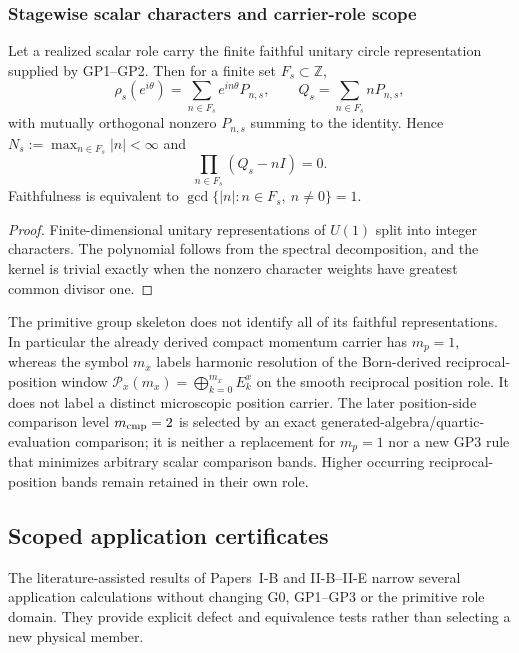 \documentclass[12pt,a4paper]{article}
\begin{document}
\subsubsection{Stagewise scalar characters and carrier-role scope}
\label{p2a:sec:v180-stagewise-scalar-character-support}

\begin{corollary}
\label{p2a:cor:stagewise-scalar-character-support}
Let a realized scalar role carry the finite faithful unitary circle
representation supplied by GP1--GP2.  Then for a finite set
$F_s\subset\mathbb Z$,
\[
 \rho_s(e^{i\theta})=\sum_{n\in F_s}e^{in\theta}P_{n,s},\qquad
 Q_s=\sum_{n\in F_s}nP_{n,s},
\]
with mutually orthogonal nonzero $P_{n,s}$ summing to the identity.  Hence
$N_s:=\max_{n\in F_s}|n|<\infty$ and
\[
 \prod_{n\in F_s}(Q_s-nI)=0.
\]
Faithfulness is equivalent to
$\gcd\{|n|:n\in F_s,\ n\ne0\}=1$.
\end{corollary}
\begin{proof}
Finite-dimensional unitary representations of $U(1)$ split into integer
characters.  The polynomial follows from the spectral decomposition, and the
kernel is trivial exactly when the nonzero character weights have greatest
common divisor one.
\end{proof}

\begin{remark}
\label{p2a:rem:scalar-skeleton-carrier-comparison}
The primitive group skeleton does not identify all of its faithful
representations.  In particular the already derived compact momentum carrier
has $m_p=1$, whereas the symbol $m_x$ labels harmonic resolution of the
Born-derived reciprocal-position window
$\mathcal P_x(m_x)=\bigoplus_{k=0}^{m_x}E_k^x$ on the smooth reciprocal
position role.  It does not label a distinct microscopic position carrier.
The later position-side comparison level $m_{\rm cmp}=2$ is selected by an
exact generated-algebra/quartic-evaluation comparison; it is neither a
replacement for $m_p=1$ nor a new GP3 rule that minimizes arbitrary scalar
comparison bands.  Higher occurring reciprocal-position bands remain retained
in their own role.
\end{remark}

\subsection{Scoped application certificates}
\label{p2a:sec:v2210-lit-application-certificates}
The literature-assisted results of Papers~I-B and II-B--II-E narrow several
application calculations without changing G0, GP1--GP3 or the primitive
role domain.  They provide explicit defect and equivalence tests rather
than selecting a new physical member.
\end{document}
